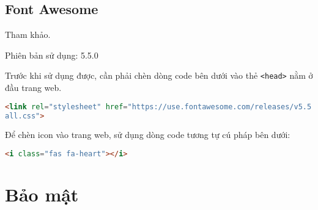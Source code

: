 \subsection{Font Awesome}
Tham khảo\cite{awesome}.
\\\par
Phiên bản sử dụng: 5.5.0
\\\par
Trước khi sử dụng được, cần phải chèn dòng code bên dưới vào thẻ \texttt{<head>} nằm ở đầu trang web.
\begin{lstlisting}[language=HTML]
<link rel="stylesheet" href="https://use.fontawesome.com/releases/v5.5.0/css/
all.css">
\end{lstlisting}
\par
Để chèn icon vào trang web, sử dụng dòng code tương tự cú pháp bên dưới:
\begin{lstlisting}[language=HTML]
<i class="fas fa-heart"></i>
\end{lstlisting}
\section{Bảo mật}
